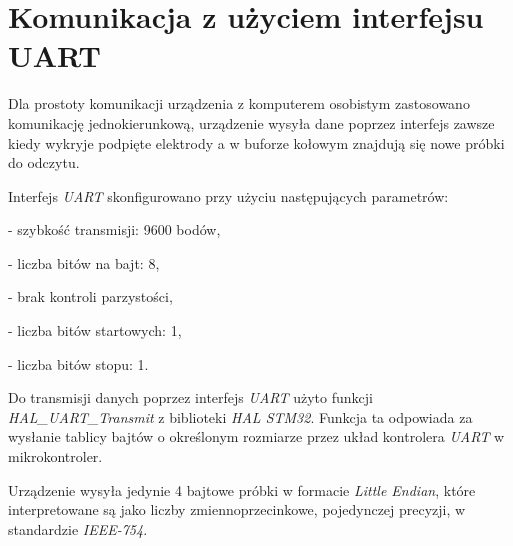 \section{Komunikacja z użyciem interfejsu UART}

Dla prostoty komunikacji urządzenia z komputerem osobistym zastosowano komunikację jednokierunkową,
urządzenie wysyła dane poprzez interfejs zawsze kiedy wykryje podpięte elektrody a w buforze kołowym
znajdują się nowe próbki do odczytu. 

Interfejs \textit{UART} skonfigurowano przy użyciu następujących parametrów:

- szybkość transmisji: 9600 bodów,

- liczba bitów na bajt: 8,

- brak kontroli parzystości,

- liczba bitów startowych: 1,

- liczba bitów stopu: 1.

Do transmisji danych poprzez interfejs \textit{UART} użyto funkcji \textit{HAL\_UART\_Transmit} z biblioteki \textit{HAL STM32}.
Funkcja ta odpowiada za wysłanie tablicy bajtów o określonym rozmiarze przez układ kontrolera \textit{UART} w mikrokontroler.

Urządzenie wysyła jedynie 4 bajtowe próbki w formacie \textit{Little Endian}, 
które interpretowane są jako liczby zmiennoprzecinkowe, pojedynczej precyzji, w standardzie \textit{IEEE-754}.

